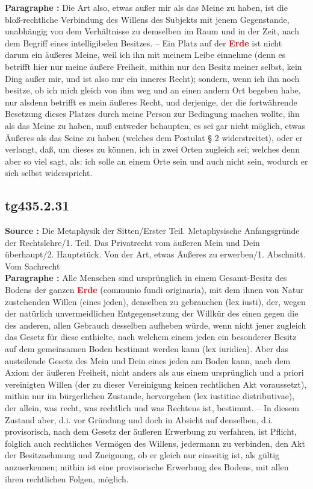 \documentclass[a4paper,12pt,twoside]{book}
\newcommand{\match}[1]{\textcolor{red}{\textbf{#1}}}
\begin{document}
	\textbf{Paragraphe : }Die Art also, etwas außer mir als das Meine zu haben, ist die bloß-rechtliche Verbindung des Willens des Subjekts mit jenem Gegenstande, unabhängig von dem Verhältnisse zu demselben im Raum und in der Zeit, nach dem Begriff eines intelligibelen Besitzes. – Ein Platz auf der \match{Erde} ist nicht darum ein äußeres Meine, weil ich ihn mit meinem Leibe einnehme (denn es betrifft hier nur meine äußere Freiheit, mithin nur den Besitz meiner selbst, kein Ding außer mir, und ist also nur ein inneres Recht); sondern, wenn ich ihn noch besitze, ob ich mich gleich von ihm weg und an einen andern Ort begeben habe, nur alsdenn betrifft es mein äußeres Recht, und derjenige, der die fortwährende Besetzung dieses Platzes durch meine Person zur Bedingung machen wollte, ihn als das Meine zu haben, muß entweder behaupten, es sei gar nicht möglich, etwas Äußeres als das Seine zu haben (welches dem Postulat § 2 widerstreitet), oder er verlangt, daß, um dieses zu können, ich in zwei Orten zugleich sei; welches denn aber so viel sagt, als: ich solle an einem Orte sein und auch nicht sein, wodurch er sich selbst widerspricht. 
	
	\subsection*{tg435.2.31} 
	\textbf{Source : }Die Metaphysik der Sitten/Erster Teil. Metaphysische Anfangsgründe der Rechtslehre/1. Teil. Das Privatrecht vom äußeren Mein und Dein überhaupt/2. Hauptstück. Von der Art, etwas Äußeres zu erwerben/1. Abschnitt. Vom Sachrecht\\  
	
	\textbf{Paragraphe : }Alle Menschen sind ursprünglich in einem Gesamt-Besitz des Bodens der ganzen \match{Erde} (communio fundi originaria), mit dem ihnen von Natur zustehenden Willen (eines jeden), denselben zu gebrauchen (lex iusti), der, wegen der natürlich unvermeidlichen Entgegensetzung der Willkür des einen gegen die des anderen, allen Gebrauch desselben aufheben würde, wenn nicht jener zugleich das Gesetz für diese enthielte, nach welchem einem jeden ein besonderer Besitz auf dem gemeinsamen Boden bestimmt werden kann (lex iuridica). Aber das austeilende Gesetz des Mein und Dein eines jeden am Boden kann, nach dem Axiom der äußeren Freiheit, nicht anders als aus einem ursprünglich und a priori vereinigten Willen (der zu dieser Vereinigung keinen rechtlichen Akt voraussetzt), mithin nur im bürgerlichen Zustande, hervorgehen (lex iustitiae distributivae), der allein, was recht, was rechtlich und was Rechtens ist, bestimmt. – In diesem Zustand aber, d.i. vor Gründung und doch in Absicht auf denselben, d.i. provisorisch, nach dem Gesetz der äußeren Erwerbung zu verfahren, ist Pflicht, folglich auch rechtliches Vermögen des Willens, jedermann zu verbinden, den Akt der Besitznehmung und Zueignung, ob er gleich nur einseitig ist, als gültig anzuerkennen; mithin ist eine provisorische Erwerbung des Bodens, mit allen ihren rechtlichen Folgen, möglich. 
	
\end{document}
